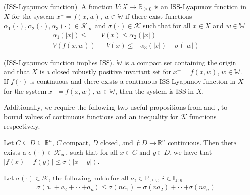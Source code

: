 \documentclass[preprint,5p, twocolumn, authoryear]{elsarticle}
\newcommand{\bbR}{\mathbb{R}}
\newcommand{\bbW}{\mathbb{W}}
\newcommand{\bbI}{\mathbb{I}}
\begin{document}
\begin{definition} \label{def:iss_lyapunov_func}
(ISS-Lyapunov function). A function $V : X \rightarrow \bbR_{\geq 0}$
is an ISS-Lyapunov function in $X$ for the system $x^+ = f(x, w)$, $w \in \bbW$
if there exist functions $\alpha_1(\cdot), \alpha_2(\cdot), \alpha_3(\cdot) 
\in \mathcal{K}_{\infty}$ and $\sigma(\cdot) \in \mathcal{K}$
such that for all $x \in X$ and $w \in \bbW$
\begin{align*}
    \alpha_1(\vert x \vert) \leq & V(x) \leq \alpha_2(\vert x \vert) \\
    V(f(x, w)) &- V(x) \leq -\alpha_3(\vert x \vert) + \sigma(\vert w \vert)
\end{align*}
\end{definition}

\begin{prop} \label{prop:lyapunov_implies_iss}
(ISS-Lyapunov function implies ISS). $\bbW$ is a compact
set containing the origin and that $X$ is a closed robustly
positive invariant set for $x^+ = f(x, w)$, $w \in \bbW$. If 
$f(\cdot)$ is continuous and there exists a continuous 
ISS-Lyapunov function in $X$ for the system $x^+ = f(x, w)$, $w \in \bbW$, 
then the system is ISS in $X$.
\end{prop}

Additionally, we require the following two 
useful propositions from 
\cite*{allan:bates:risbeck:rawlings:2017} and 
\cite*{rawlings:ji:2012},
to bound values of continuous functions and an
inequality for $\mathcal{K}$ functions respectively.

\begin{prop} \label{prop:continuous_funcs}
    Let $C \subseteq D \subseteq \bbR^n$, $C$ compact, 
    $D$ closed, and $f : D \rightarrow \bbR^n$ continuous.  
    Then there exists a $\sigma(\cdot) \in \mathcal{K}_{\infty}$,
    such that for all $x \in C$ and $y \in D$, we have that 
    $\vert f(x) - f(y) \vert \leq \sigma(\vert x-y \vert)$.
\end{prop}
    
\begin{prop} \label{prop:Kfunction_inequality}
    Let $\sigma(\cdot) \in \mathcal{K}$, the following holds 
    for all $a_i \in \bbR_{\geq 0}$, $i \in \bbI_{1:n}$ 
    \begin{align*}
        \sigma(a_1 + a_2 + \cdot \cdot + a_n) \leq \sigma(na_1) + 
        \sigma(na_2) + \cdot \cdot + \sigma(na_n)
    \end{align*}    
\end{prop}
\end{document}
